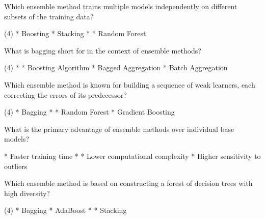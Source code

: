 \documentclass[11pt]{extarticle}
\begin{document}
\begin{exercise}
    Which ensemble method trains multiple models independently on different subsets of the training data?
    \begin{choice}(4)
        * Boosting
        * Stacking
        * 
        * Random Forest
    \end{choice}
\end{exercise}
\begin{solution}
\end{solution}

\begin{exercise}
    What is bagging short for in the context of ensemble methods?

    \begin{choice}(4)
        * 
        * Boosting Algorithm
        * Bagged Aggregation
        * Batch Aggregation
    \end{choice}
\end{exercise}
\begin{solution}
\end{solution}

\begin{exercise}
    Which ensemble method is known for building a sequence of weak learners, each correcting the errors of its predecessor?
    \begin{choice} (4)
        * Bagging
        * 
        * Random Forest
        * Gradient Boosting
    \end{choice}
\end{exercise}
\begin{solution}
\end{solution}

\begin{exercise}
    What is the primary advantage of ensemble methods over individual base models?
    \begin{choice}
        * Faster training time
        * 
        * Lower computational complexity
        * Higher sensitivity to outliers
    \end{choice}
\end{exercise}
\begin{solution}
\end{solution}

\begin{exercise}
    Which ensemble method is based on constructing a forest of decision trees with high diversity?
    \begin{choice}(4)
        * Bagging
        * AdaBoost
        * 
        * Stacking
    \end{choice}
\end{exercise}
\begin{solution}
\end{solution}
\end{document}
